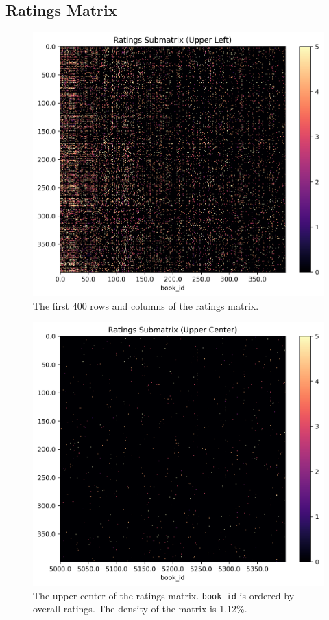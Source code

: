 \documentclass[handout]{beamer}
\begin{document}
\subsection{Ratings Matrix}\label{ratings-matrix}

\begin{frame}

\begin{figure}
    \centering
    \includegraphics[height=0.7\paperheight, width=0.7\linewidth]{../image/goodreads-models/ratings-submatrix-upper-left.png}
    \caption[Ratings Submatrix]{The first 400 rows and columns of the ratings matrix.}
     \label{fig:ratings-submatrix-upper-left}
\end{figure}
\end{frame}

\begin{frame}
 

\begin{figure}
    \centering
    \includegraphics[height=0.7\paperheight, width=0.7\linewidth]{../image/goodreads-models/ratings-submatrix-upper-center.png}
    \caption[Ratings Submatrix (Center)]{The upper center of the ratings matrix. \texttt{book\_id} is ordered by overall ratings. The density of the matrix is 1.12\%.}
     \label{fig:ratings-submatrix-upper-left-center}
\end{figure}
\end{frame}
\end{document}
